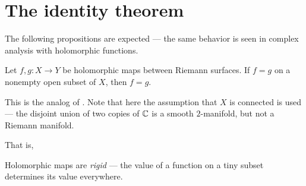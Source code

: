 \section{The identity theorem}

The following propositions are expected --- the same behavior is seen in complex analysis with
holomorphic functions.

\begin{theorem}
	Let $f, g \colon X \to Y$ be holomorphic maps between Riemann surfaces. If $f = g$ on a nonempty
	open subset of $X$, then $f = g$.
\end{theorem}
This is the analog of . Note that here the assumption that $X$ is connected
is used --- the disjoint union of two copies of $\mathbb C$ is a smooth $2$-manifold, but not a Riemann
manifold.

That is,
\begin{moral}
	Holomorphic maps are \emph{rigid} --- the value of a function on a tiny subset determines its
	value everywhere.
\end{moral}
